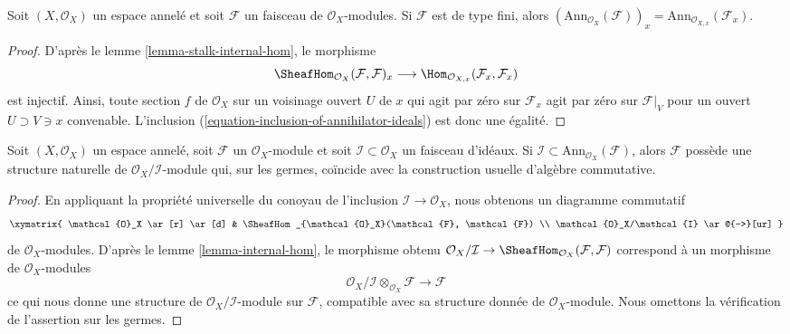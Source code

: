 \begin{lemma}
\label{lemma-finite-type-annihilator-stalk}
Soit $(X, \mathcal{O}_X)$ un espace annelé et soit
$\mathcal{F}$ un faisceau de $\mathcal{O}_X$-modules.
Si $\mathcal{F}$ est de type fini, alors
$(\text{Ann}_{\mathcal{O}_X}(\mathcal{F}))_x =
\text{Ann}_{\mathcal{O}_{X, x}}(\mathcal{F}_x)$.
\end{lemma}

\begin{proof}
D'après le lemme \ref{lemma-stalk-internal-hom}, le morphisme
$$
\SheafHom_{\mathcal{O}_X}(\mathcal{F}, \mathcal{F})_x \longrightarrow
\Hom_{\mathcal{O}_{X,x}}(\mathcal{F}_x, \mathcal{F}_x)
$$
est injectif. Ainsi, toute section $f$ de $\mathcal{O}_X$ sur un voisinage
ouvert $U$ de $x$ qui agit par zéro sur $\mathcal{F}_x$
agit par zéro sur $\mathcal{F}|_V$ pour un ouvert $U \supset V \ni x$ convenable.
L'inclusion (\ref{equation-inclusion-of-annihilator-ideals})
est donc une égalité.
\end{proof}

\begin{lemma}
\label{lemma-induced-quotient-ring-sheaf-module-structure}
Soit $(X, \mathcal{O}_X)$ un espace annelé, soit $\mathcal{F}$ un
$\mathcal{O}_X$-module et soit $\mathcal{I} \subset \mathcal{O}_X$
un faisceau d'idéaux. Si
$\mathcal{I} \subset \text{Ann}_{\mathcal{O}_X}(\mathcal{F})$,
alors $\mathcal{F}$ possède une structure naturelle de
$\mathcal{O}_X/\mathcal{I}$-module qui, sur les germes, coïncide avec
la construction usuelle d'algèbre commutative.
\end{lemma}

\begin{proof}
En appliquant la propriété universelle du conoyau de l'inclusion
$\mathcal{I} \to \mathcal{O}_X$, nous obtenons un diagramme commutatif
$$
\xymatrix{
\mathcal{O}_X \ar[r] \ar[d] &
\SheafHom_{\mathcal{O}_X}(\mathcal{F}, \mathcal{F}) \\
\mathcal{O}_X/\mathcal{I} \ar@{-->}[ur]
}
$$
de $\mathcal{O}_X$-modules. D'après le lemme \ref{lemma-internal-hom},
le morphisme obtenu $\mathcal{O}_X/\mathcal{I} \to
\SheafHom_{\mathcal{O}_X}(\mathcal{F}, \mathcal{F})$
correspond à un morphisme de $\mathcal{O}_X$-modules
$$
\mathcal{O}_X/\mathcal{I} \otimes_{\mathcal{O}_X} \mathcal{F}
\longrightarrow
\mathcal{F}
$$
ce qui nous donne une structure de $\mathcal{O}_X/\mathcal{I}$-module
sur $\mathcal{F}$, compatible avec sa structure donnée de $\mathcal{O}_X$-module.
Nous omettons la vérification de l'assertion sur les germes.
\end{proof}

